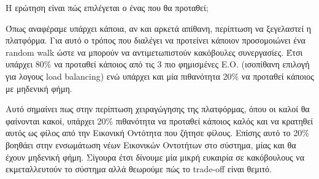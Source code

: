 Η ερώτηση είναι πώς επιλέγεται ο ένας που θα προταθεί;

Όπως αναφέραμε υπάρχει κάποια, αν και αρκετά απίθανη, περίπτωση να ξεγελαστεί η πλατφόρμα. Για αυτό ο τρόπος που διαλέγει να προτείνει κάποιον προσομοιώνει ένα random walk ώστε να μπορούν να αντιμετωπιστούν κακόβουλες συνεργασίες. Έτσι υπάρχει 80\% να προταθεί κάποιος από τις 3 πιο φημισμένες Ε.Ο. (ισοπίθανη επιλογή για λογους load balancing) ενώ υπάρχει και μία πιθανότητα 20\% να προταθεί κάποιος με μηδενική φήμη.

Αυτό σημαίνει πως στην περίπτωση χειραγώγησης της πλατφόρμας, όπου οι καλοί θα φαίνονται κακοί, υπάρχει 20\% πιθανότητα να προταθεί κάποιος καλός και να  κρατηθεί αυτός ως φίλος από την Εικονική Οντότητα που ζήτησε φίλους. Επίσης αυτό το 20\% βοηθάει στην ενσωμάτωση νέων Εικονικών Οντοτήτων στο σύστημα, μίας και θα έχουν μηδενική φήμη.
Σίγουρα έτσι δίνουμε μία μικρή ευκαιρία σε κακόβουλους να εκμεταλλευτούν το σύστημα αλλά θεωρούμε πώς το trade-off είναι θεμιτό.




